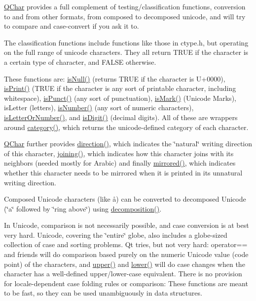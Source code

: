 \mbox{\hyperlink{class_q_char}{Q\+Char}} provides a full complement of testing/classification functions, conversion to and from other formats, from composed to decomposed unicode, and will try to compare and case-\/convert if you ask it to.

The classification functions include functions like those in ctype.\+h, but operating on the full range of unicode characters. They all return T\+R\+UE if the character is a certain type of character, and F\+A\+L\+SE otherwise.

These functions are\+: \mbox{\hyperlink{class_q_char_a580c84db3f1208df21a8427a01fc725c}{is\+Null()}} (returns T\+R\+UE if the character is U+0000), \mbox{\hyperlink{class_q_char_a569287b3f87942299de440ec40549d94}{is\+Print()}} (T\+R\+UE if the character is any sort of printable character, including whitespace), \mbox{\hyperlink{class_q_char_a1242013d955d60b26acbba3ed63d556f}{is\+Punct()}} (any sort of punctuation), \mbox{\hyperlink{class_q_char_a5b932436088d0aebdeb8d5ec0d13fe54}{is\+Mark()}} (Unicode Marks), is\+Letter (letters), \mbox{\hyperlink{class_q_char_a95ea2bc6938379f1e108b44d61133d29}{is\+Number()}} (any sort of numeric characters), \mbox{\hyperlink{class_q_char_a4307e02d8de59b2a5c4e7a2fc62aa028}{is\+Letter\+Or\+Number()}}, and \mbox{\hyperlink{class_q_char_a5758b5318fe28041c0729dded5b1b44e}{is\+Digit()}} (decimal digits). All of these are wrappers around \mbox{\hyperlink{class_q_char_a4bc1ffcdc40c674015b3bb9e9114637e}{category()}}, which returns the unicode-\/defined category of each character.

\mbox{\hyperlink{class_q_char}{Q\+Char}} further provides \mbox{\hyperlink{class_q_char_ad01050969cdddf81a9d956a93da209c6}{direction()}}, which indicates the \char`\"{}natural\char`\"{} writing direction of this character, \mbox{\hyperlink{class_q_char_ad009b86964d2cced7c75235f3292b03f}{joining()}}, which indicates how this character joins with its neighbors (needed mostly for Arabic) and finally \mbox{\hyperlink{class_q_char_ace551e353be06621f91e605f33aa49e6}{mirrored()}}, which indicates whether this character needs to be mirrored when it is printed in its unnatural writing direction.

Composed Unicode characters (like \aa) can be converted to decomposed Unicode (\char`\"{}a\char`\"{} followed by \char`\"{}ring above\char`\"{}) using \mbox{\hyperlink{class_q_char_a8b40234fbb8bcb58ba2086a610883b7b}{decomposition()}}.

In Unicode, comparison is not necessarily possible, and case conversion is at best very hard. Unicode, covering the \char`\"{}entire\char`\"{} globe, also includes a globe-\/sized collection of case and sorting problems. Qt tries, but not very hard\+: operator== and friends will do comparison based purely on the numeric Unicode value (code point) of the characters, and \mbox{\hyperlink{class_q_char_a4418e0d46d515231d620263cd7fd0c1f}{upper()}} and \mbox{\hyperlink{class_q_char_a70eb37a2ce831bffec68645ec51dc77f}{lower()}} will do case changes when the character has a well-\/defined upper/lower-\/case equivalent. There is no provision for locale-\/dependent case folding rules or comparison\+: These functions are meant to be fast, so they can be used unambiguously in data structures.

